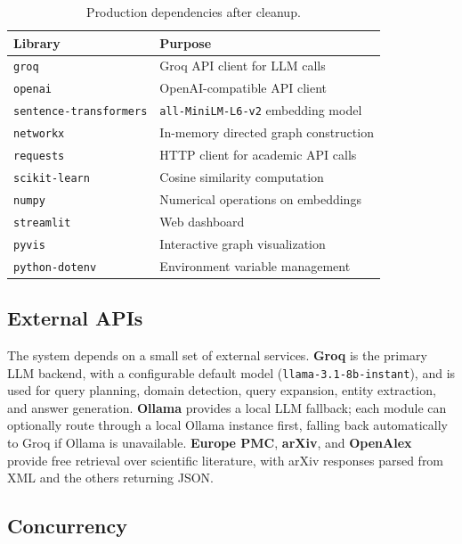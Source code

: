 \documentclass[11pt,a4paper]{article}
\begin{document}
\begin{table}[H]
\centering
\begin{tabular}{@{}ll@{}}
\toprule
\textbf{Library} & \textbf{Purpose} \\
\midrule
\texttt{groq}                & Groq API client for LLM calls \\
\texttt{openai}              & OpenAI-compatible API client \\
\texttt{sentence-transformers}& \texttt{all-MiniLM-L6-v2} embedding model \\
\texttt{networkx}            & In-memory directed graph construction \\
\texttt{requests}            & HTTP client for academic API calls \\
\texttt{scikit-learn}        & Cosine similarity computation \\
\texttt{numpy}               & Numerical operations on embeddings \\
\texttt{streamlit}           & Web dashboard \\
\texttt{pyvis}               & Interactive graph visualization \\
\texttt{python-dotenv}       & Environment variable management \\
\bottomrule
\end{tabular}
\caption{Production dependencies after cleanup.}
\end{table}

\subsection{External APIs}

The system depends on a small set of external services. \textbf{Groq} is the
primary LLM backend, with a configurable default model
(\texttt{llama-3.1-8b-instant}), and is used for query planning, domain
detection, query expansion, entity extraction, and answer generation.
\textbf{Ollama} provides a local LLM fallback; each module can optionally
route through a local Ollama instance first, falling back automatically to
Groq if Ollama is unavailable. \textbf{Europe PMC}, \textbf{arXiv}, and
\textbf{OpenAlex} provide free retrieval over scientific literature, with
arXiv responses parsed from XML and the others returning JSON.

\subsection{Concurrency}
\end{document}
